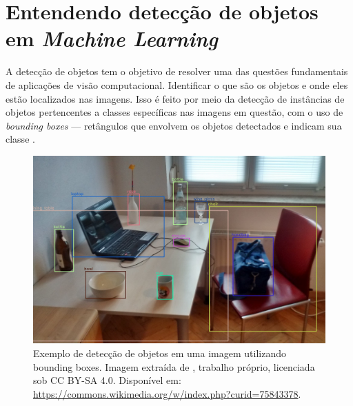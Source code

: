 \section{Entendendo detecção de objetos em \emph{Machine Learning}}
A detecção de objetos tem o objetivo de resolver uma das questões fundamentais de aplicações de visão computacional. Identificar o que são os objetos e onde eles estão localizados nas imagens. Isso é feito por meio da detecção de instâncias de objetos pertencentes a classes específicas nas imagens em questão, com o uso de \emph{bounding boxes} --- retângulos que envolvem os objetos detectados e indicam sua classe \citep{Zou2019Object}.

\begin{figure}[htb!]
    \centering
    \includegraphics[width=0.8\linewidth]{images/bounding_boxes.png}
    \caption{\label{fig:bounding_boxes} Exemplo de detecção de objetos em uma imagem utilizando bounding boxes. Imagem extraída de \citeauthor{MTheiler}, trabalho próprio, licenciada sob CC BY-SA 4.0. Disponível em: \url{https://commons.wikimedia.org/w/index.php?curid=75843378}.}
\end{figure}


